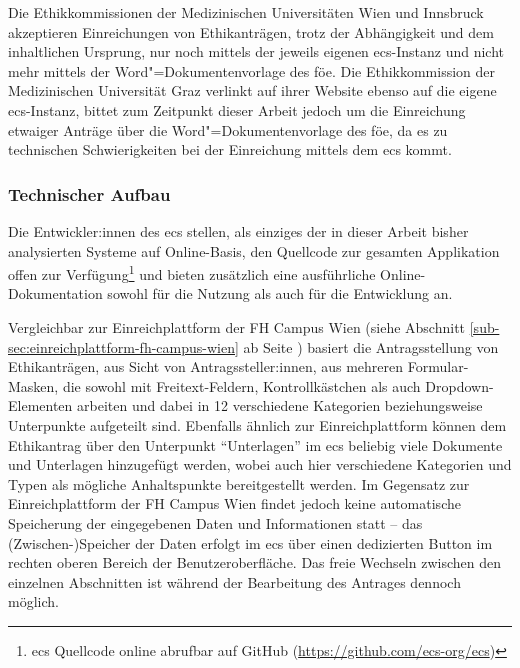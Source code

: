 \documentclass[a4paper,12pt,twoside]{scrreprt}
\begin{document}
Die Ethikkommissionen der Medizinischen Universitäten Wien und Innsbruck akzeptieren Einreichungen von Ethikanträgen, trotz der Abhängigkeit und dem inhaltlichen Ursprung, nur noch mittels der jeweils eigenen \ac{ecs}-Instanz und nicht mehr mittels der Word"=Dokumentenvorlage des \ac{föe}. \cite{ethikkommission_der_medizinischen_universitat_wien_ethik_2023, medizinische_universitat_innsbruck_einreichungen_2023} Die Ethikkommission der Medizinischen Universität Graz verlinkt auf ihrer Website ebenso auf die eigene \ac{ecs}-Instanz, bittet zum Zeitpunkt dieser Arbeit jedoch um die Einreichung etwaiger Anträge über die Word"=Dokumentenvorlage des \ac{föe}, da es zu technischen Schwierigkeiten bei der Einreichung mittels dem \ac{ecs} kommt. \cite{medizinische_universitat_graz_ethikkommission_2023}

\subsubsection*{Technischer Aufbau}
\label{sub-sub-sec:ecs-technischer-aufbau}

Die Entwickler:innen des \acl{ecs} stellen, als einziges der in dieser Arbeit bisher analysierten Systeme auf Online-Basis, den Quellcode zur gesamten Applikation offen zur Verfügung\footnote{\ac{ecs} Quellcode online abrufbar auf GitHub (\url{https://github.com/ecs-org/ecs})} und bieten zusätzlich eine ausführliche Online-Dokumentation sowohl für die Nutzung als auch für die Entwicklung an. \cite{medizinische_universitat_wien_ecs_2021-1, medizinische_universitat_wien_development_2021, medizinische_universitat_wien_installationusage_2021}

\medskip

Vergleichbar zur Einreichplattform der FH Campus Wien (siehe Abschnitt \ref{sub-sec:einreichplattform-fh-campus-wien} ab Seite \pageref{sub-sec:einreichplattform-fh-campus-wien}) basiert die Antragsstellung von Ethikanträgen, aus Sicht von Antragssteller:innen, aus mehreren Formular-Masken, die sowohl mit Freitext-Feldern, Kontrollkästchen als auch Dropdown-Elementen arbeiten und dabei in 12 verschiedene Kategorien beziehungsweise Unterpunkte aufgeteilt sind. Ebenfalls ähnlich zur Einreichplattform können dem Ethikantrag über den Unterpunkt \enquote{Unterlagen} im \ac{ecs} beliebig viele Dokumente und Unterlagen hinzugefügt werden, wobei auch hier verschiedene Kategorien und Typen als mögliche Anhaltspunkte bereitgestellt werden. Im Gegensatz zur Einreichplattform der FH Campus Wien findet jedoch keine automatische Speicherung der eingegebenen Daten und Informationen statt -- das (Zwischen-)Speicher der Daten erfolgt im \ac{ecs} über einen dedizierten Button im rechten oberen Bereich der Benutzeroberfläche. Das freie Wechseln zwischen den einzelnen Abschnitten ist während der Bearbeitung des Antrages dennoch möglich.
\end{document}
